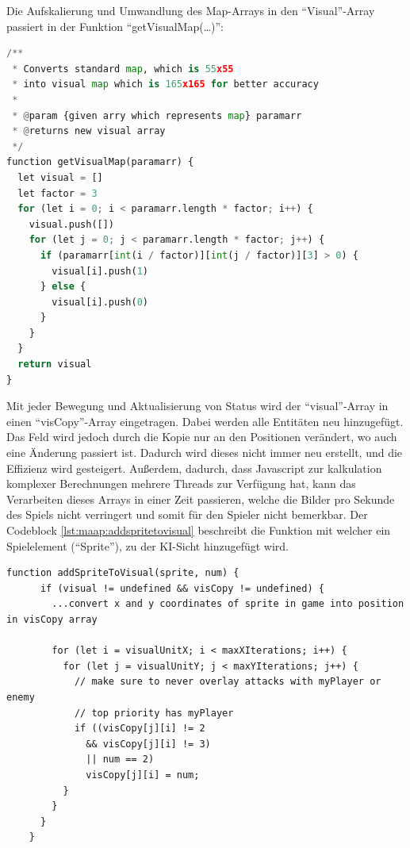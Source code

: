 Die Aufskalierung und Umwandlung des Map-Arrays in den ``Visual''-Array passiert in der Funktion ``getVisualMap(\dots)'':
\begin{lstlisting}[language=Python,label=lst:maap:getVisualMap,caption=Umwandlung des Pixel-Clumps in eine für die KI sichtbare Darstellung]
/**
 * Converts standard map, which is 55x55 
 * into visual map which is 165x165 for better accuracy
 * 
 * @param {given arry which represents map} paramarr 
 * @returns new visual array
 */
function getVisualMap(paramarr) {
  let visual = []
  let factor = 3
  for (let i = 0; i < paramarr.length * factor; i++) {
    visual.push([])
    for (let j = 0; j < paramarr.length * factor; j++) {
      if (paramarr[int(i / factor)][int(j / factor)][3] > 0) {
        visual[i].push(1)
      } else {
        visual[i].push(0)
      }
    }
  }
  return visual
}
\end{lstlisting}
Mit jeder Bewegung und Aktualisierung von Status wird der ``visual''-Array in einen ``visCopy''-Array eingetragen. Dabei werden alle Entitäten neu hinzugefügt. Das Feld wird jedoch durch die Kopie nur an den Positionen verändert, wo auch eine Änderung passiert ist. Dadurch wird dieses nicht immer neu erstellt, und die Effizienz wird gesteigert. Außerdem, dadurch, dass Javascript zur kalkulation komplexer Berechnungen mehrere Threads zur Verfügung hat, kann das Verarbeiten dieses Arrays in einer Zeit passieren, welche die Bilder pro Sekunde des Spiels nicht verringert und somit für den Spieler nicht bemerkbar.
Der Codeblock \ref{lst:maap:addspritetovisual} beschreibt die Funktion mit welcher ein
Spielelement (``Sprite''), zu der KI-Sicht hinzugefügt wird.

\begin{lstlisting}[label=lst:maap:addspritetovisual,caption=Sprite in ``visCopy''-Array eintragen]
    function addSpriteToVisual(sprite, num) {
      if (visual != undefined && visCopy != undefined) {
        ...convert x and y coordinates of sprite in game into position in visCopy array
    
        for (let i = visualUnitX; i < maxXIterations; i++) {
          for (let j = visualUnitY; j < maxYIterations; j++) {
            // make sure to never overlay attacks with myPlayer or enemy
            // top priority has myPlayer
            if ((visCopy[j][i] != 2
              && visCopy[j][i] != 3)
              || num == 2)
              visCopy[j][i] = num;
          }
        }
      }
    }
\end{lstlisting}


